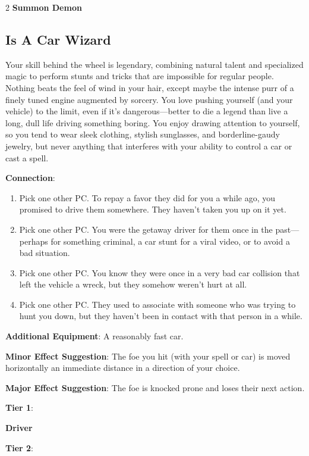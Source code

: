 \begin{multicols}{2}
\textbf{Summon Demon}

\subsection{Is A Car Wizard} 

Your skill behind the wheel is legendary, combining natural talent and specialized magic to perform stunts and tricks that are impossible for regular people. Nothing beats the feel of wind in your hair, except maybe the intense purr of a finely tuned engine augmented by sorcery. You love pushing yourself (and your vehicle) to the limit, even if it’s dangerous—better to die a legend than live a long, dull life driving something boring. You enjoy drawing attention to yourself, so you tend to wear sleek clothing, stylish sunglasses, and borderline-gaudy jewelry, but never anything that interferes with your ability to control a car or cast a spell.

\textbf{Connection}:
\begin{enumerate} 
\item Pick one other PC. To repay a favor they did for you a while ago, you promised to drive them somewhere. They haven’t taken you up on it yet.
\item Pick one other PC. You were the getaway driver for them once in the past— perhaps for something criminal, a car stunt for a viral video, or to avoid a bad situation.
\item Pick one other PC. You know they were once in a very bad car collision that left the vehicle a wreck, but they somehow weren’t hurt at all.
\item Pick one other PC. They used to associate with someone who was trying to hunt you down, but they haven’t been in contact with that person in a while.
\end{enumerate}

\textbf{Additional Equipment}: A reasonably fast car.

\textbf{Minor Effect Suggestion}: The foe you hit (with your spell or car) is moved horizontally an immediate distance in a direction of your choice.

\textbf{Major Effect Suggestion}: The foe is knocked prone and loses their next action.

\textbf{Tier 1}:

\textbf{Driver} 

\textbf{Tier 2}:


\end{multicols}
